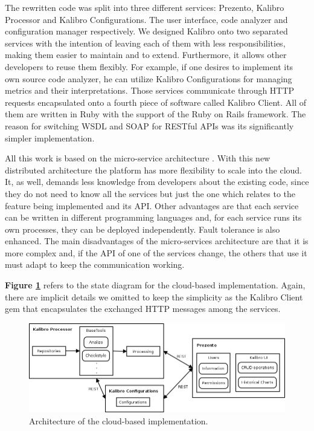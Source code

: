The rewritten code was split into three different services: Prezento, Kalibro Processor and Kalibro Configurations. The user interface, code analyzer and configuration manager respectively. We designed Kalibro onto two separated services with the intention of leaving each of them with less responsibilities, making them easier to maintain and to extend. Furthermore, it allows other developers to reuse them flexibly. For example, if one desires to implement its own source code analyzer, he can utilize Kalibro Configurations for managing metrics and their interpretations. Those services communicate through HTTP requests encapsulated onto a fourth piece of software called Kalibro Client. All of them are written in Ruby with the support of the Ruby on Rails framework. The reason for switching WSDL and SOAP for RESTful APIs was its significantly simpler implementation.

All this work is based on the micro-service architecture \cite{namiot2014micro}. With this new distributed architecture the platform has more flexibility to scale into the cloud. It, as well, demands less knowledge from developers about the existing code, since they do not need to know all the services but just the one which relates to the feature being implemented and its API. Other advantages are that each service can be written in different programming languages and, for each service runs its own processes, they can be deployed independently. Fault tolerance is also enhanced. The main disadvantages of the micro-services architecture are that it is more complex and, if the API of one of the services change, the others that use it must adapt to keep the communication working.

\textbf{Figure \ref{fig:mezuro-cloud-arch}} refers to the state diagram for the cloud-based implementation. Again, there are implicit details we omitted to keep the simplicity as the Kalibro Client gem that encapsulates the exchanged HTTP messages among the services.

\begin{figure}[htb]
  \centering
  \includegraphics[width=\textwidth]{images/mezuro-cloud-arch.png}
  \caption{Architecture of the cloud-based implementation.}
  \label{fig:mezuro-cloud-arch}
\end{figure}

